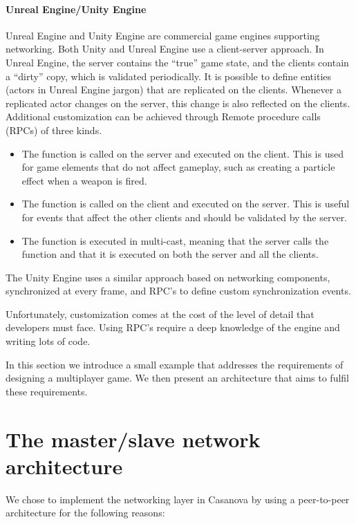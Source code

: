 \paragraph{Unreal Engine/Unity Engine} Unreal Engine \cite{games2006unreal} and Unity Engine \cite{engine9unity} are commercial game engines supporting networking.  Both Unity and Unreal Engine use a client-server approach. In Unreal Engine, the server contains the ``true'' game state, and the clients contain a ``dirty'' copy, which is validated periodically. It is possible to define entities (actors in Unreal Engine jargon) that are replicated on the clients. Whenever a replicated actor changes on the server, this change is also reflected on the clients. Additional customization can be achieved through Remote procedure calls (RPCs) of three kinds.
\begin{itemize}
	\item The function is called on the server and executed on the client. This is used for game elements that do not affect gameplay, such as creating a particle effect when a weapon is fired.
	\item The function is called on the client and executed on the server. This is useful for events that affect the other clients and should be validated by the server.
	\item The function is executed in multi-cast, meaning that the server calls the function and that it is executed on both the server and all the clients.
\end{itemize}

The Unity Engine uses a similar approach based on networking components, synchronized at every frame, and RPC's to define custom synchronization events.

Unfortunately, customization comes at the cost of the level of detail that developers must face. Using RPC's require a deep knowledge of the engine and writing lots of code. 

In this section we introduce a small example that addresses the requirements of designing a multiplayer game. We then present an architecture that aims to fulfil these requirements.

\section{The master/slave network architecture}

We chose to implement the networking layer in Casanova by using a peer-to-peer architecture for the following reasons:

